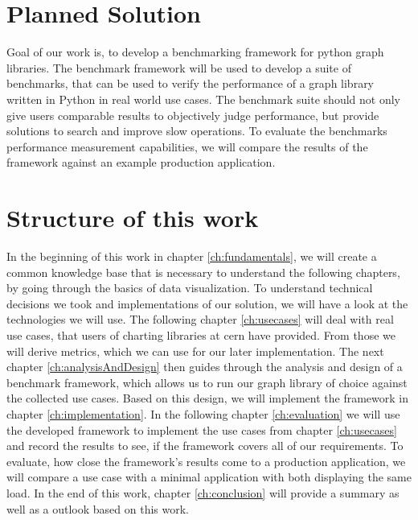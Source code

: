 
\section{Planned Solution}
\label{sec:Introduction:problem}

Goal of our work is, to develop a benchmarking framework for python graph
libraries.  The benchmark framework will be used to develop a suite of
benchmarks, that can be used to verify the performance of a graph library
written in Python in real world use cases. The benchmark suite should not only
give users comparable results to objectively judge performance, but provide
solutions to search and improve slow operations. To evaluate the benchmarks
performance measurement capabilities, we will compare the results of the
framework against an example production application.
  




\section{Structure of this work}
\label{sec:Introduction:problem}

In the beginning of this work in chapter \ref{ch:fundamentals}, we will create a
common knowledge base that is necessary to understand the following chapters, by
going through the basics of data visualization. To understand technical
decisions we took and implementations of our solution, we will have a look at
the technologies we will use. The following chapter \ref{ch:usecases} will deal
with real use cases, that users of charting libraries at \gls{cern} have
provided. From those we will derive metrics, which we can use for our later
implementation. The next chapter \ref{ch:analysisAndDesign} then guides through
the analysis and design of a benchmark framework, which allows us to run our
graph library of choice against the collected use cases.  Based on this design,
we will implement the framework in chapter \ref{ch:implementation}. In the
following chapter \ref{ch:evaluation} we will use the developed framework to
implement the use cases from chapter \ref{ch:usecases} and record the results to
see, if the framework covers all of our requirements.  To evaluate, how close
the framework's results come to a production application, we will compare a use
case with a minimal application with both displaying the same load. In the end
of this work, chapter \ref{ch:conclusion} will provide a summary as well as a
outlook based on this work.
